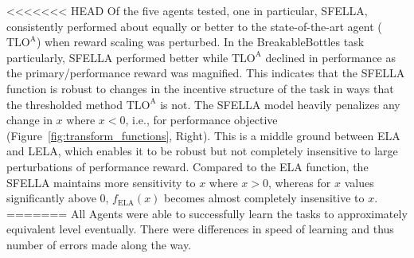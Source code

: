 


<<<<<<< HEAD
Of the five agents tested, one in particular, SFELLA, consistently performed about equally or better to the state-of-the-art agent ($\text{TLO}^\text{A}$) when reward scaling was perturbed. In the BreakableBottles task particularly, SFELLA performed better while $\text{TLO}^\text{A}$ declined in performance as the primary/performance reward was magnified. This indicates that the SFELLA function is robust to changes in the incentive structure of the task in ways that the thresholded method $\text{TLO}^\text{A}$ is not. The SFELLA model heavily penalizes any change in $x$ where $x<0$, i.e., for performance objective (Figure~\ref{fig:transform_functions}, Right). This is a middle ground between ELA and LELA, which enables it to be robust but not completely insensitive to large perturbations of performance reward. Compared to the ELA function, the SFELLA maintains more sensitivity to $x$ where $x>0$, whereas for $x$ values significantly above 0, $f_{\text{ELA}}(x)$ becomes almost completely insensitive to $x$. 
=======
All Agents were able to successfully learn the tasks to approximately equivalent level eventually. There were differences in speed of learning and thus number of errors made along the way.

